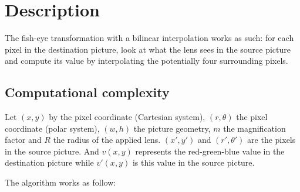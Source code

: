 \documentclass[10pt,a4paper]{article}
\begin{document}
\maketitle


\section{Description}

The fish-eye transformation with a bilinear interpolation works as such: for
each pixel in the destination picture, look at what the lens sees in the
source picture and compute its value by interpolating the potentially four
surrounding pixels.

\subsection{Computational complexity}

Let $(x, y)$ by the pixel coordinate (Cartesian system), $(r, \theta)$ the
pixel coordinate (polar system), $(w, h)$ the picture geometry, $m$ the
magnification factor and $R$ the radius of the applied lens. $(x\prime,
y\prime)$ and $(r\prime, \theta\prime)$ are the pixels in the source picture.
And $v(x,y)$ represents the red-green-blue value in the destination picture
while $v\prime(x,y)$ is this value in the source picture.

The algorithm works as follow:
\end{document}
